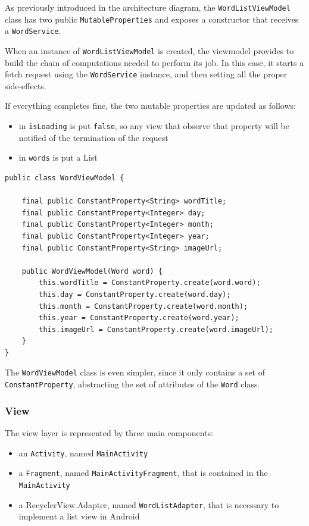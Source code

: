 As previously introduced in the architecture diagram, the
\texttt{WordListViewModel} class has two public
\texttt{MutableProperties} and exposes a constructor that receives a
\texttt{WordService}.

When an instance of \texttt{WordListViewModel} is created, the viewmodel
provides to build the chain of computations needed to perform its job.
In this case, it starts a fetch request using the \texttt{WordService}
instance, and then setting all the proper side-effects.

If everything completes fine, the two mutable properties are updated as
follows:

\begin{itemize}
\itemsep1pt\parskip0pt
\item
  in \texttt{isLoading} is put \texttt{false}, so any view that observe
  that property will be notified of the termination of the request
\item
  in \texttt{words} is put a List
\end{itemize}

\begin{verbatim}
public class WordViewModel {

    final public ConstantProperty<String> wordTitle;
    final public ConstantProperty<Integer> day;
    final public ConstantProperty<Integer> month;
    final public ConstantProperty<Integer> year;
    final public ConstantProperty<String> imageUrl;

    public WordViewModel(Word word) {
        this.wordTitle = ConstantProperty.create(word.word);
        this.day = ConstantProperty.create(word.day);
        this.month = ConstantProperty.create(word.month);
        this.year = ConstantProperty.create(word.year);
        this.imageUrl = ConstantProperty.create(word.imageUrl);
    }
}
\end{verbatim}

The \texttt{WordViewModel} class is even simpler, since it only contains
a set of \texttt{ConstantProperty}, abstracting the set of attributes of
the \texttt{Word} class.

\subsubsection{View}\label{view}

The view layer is represented by three main components:

\begin{itemize}
\itemsep1pt\parskip0pt
\item
  an \texttt{Activity}, named \texttt{MainActivity}
\item
  a \texttt{Fragment}, named \texttt{MainActivityFragment}, that is
  contained in the \texttt{MainActivity}
\item
  a RecyclerView.Adapter, named \texttt{WordListAdapter}, that is
  necessary to implement a list view in Android
\end{itemize}

